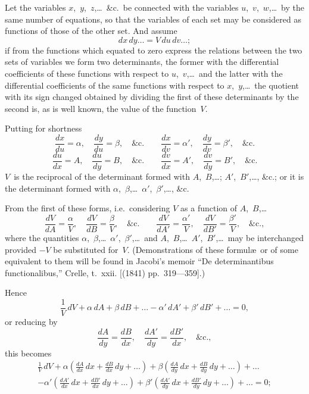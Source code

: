 \documentclass[11pt,a4paper]{book}
\begin{document}
\vspace{10pt}

 Let the variables $x$,~$y$,~$z$,\ldots\ \&c.\ be connected with the variables $u$,~$v$,~$w$,\ldots\ by the same number of equations, so that the variables of each set may be considered as functions of those of the other set. And assume
\[
dx\,dy\ldots = V\,du\,dv\ldots;
\]
if from the functions which equated to zero express the relations between the two sets of variables we form two determinants, the former with the differential coefficients of these functions with respect to $u$,~$v$,\ldots\ and the latter with the differential coefficients of the same functions with respect to $x$,~$y$,\ldots\ the quotient with its sign changed obtained by dividing the first of these determinants by the second is, as is well known, the value of the function~$V$.

Putting for shortness
\[
\frac{dx}{du} = \alpha, \quad \frac{dy}{du} = \beta, \quad \&\text{c.} \qquad
\frac{dx}{dv} = \alpha', \quad \frac{dy}{dv} = \beta', \quad \&\text{c.}
\]
\[
\frac{du}{dx} = A, \quad \frac{du}{dy} = B, \quad \&\text{c.} \qquad
\frac{dv}{dx} = A', \quad \frac{dv}{dy} = B', \quad \&\text{c.}
\]
$V$~is the reciprocal of the determinant formed with $A$,~$B$,\ldots; $A'$,~$B'$,\ldots, \&c.; or it is the determinant formed with $\alpha$,~$\beta$,\ldots\ $\alpha'$,~$\beta'$,\ldots, \&c.

From the first of these forms, i.e.\ considering $V$ as a function of $A$,~$B$,\ldots
\[
\frac{dV}{dA} = \frac{\alpha}{V}, \quad \frac{dV}{dB} = \frac{\beta}{V}, \quad \&\text{c.} \qquad
\frac{dV}{dA'} = \frac{\alpha'}{V}, \quad \frac{dV}{dB'} = \frac{\beta'}{V}, \quad \&\text{c.},
\]
where the quantities $\alpha$,~$\beta$,\ldots\ $\alpha'$,~$\beta'$,\ldots\ and $A$,~$B$,\ldots\ $A'$,~$B'$,\ldots\ may be interchanged provided $-V$ be substituted for~$V$. (Demonstrations of these formul\ae\ or of some equivalent to them will be found in Jacobi's memoir ``De determinantibus functionalibus,'' Crelle, t.~xxii. [(1841) pp.~319---359].)

Hence
\[
\frac{1}{V}\,dV + \alpha\,dA + \beta\,dB + \ldots - \alpha'\,dA' + \beta'\,dB' + \ldots = 0,
\]
or reducing by
\[
\frac{dA}{dy} = \frac{dB}{dx}, \quad \frac{dA'}{dy} = \frac{dB'}{dx}, \quad \&\text{c.},
\]
this becomes
\begin{multline*}
\frac{1}{V}\,dV + \alpha\left(\frac{dA}{dx}\,dx + \frac{dB}{dx}\,dy + \ldots\right) + \beta\left(\frac{dA}{dy}\,dx + \frac{dB}{dy}\,dy + \ldots\right) + \ldots \\
- \alpha'\left(\frac{dA'}{dx}\,dx + \frac{dB'}{dx}\,dy + \ldots\right) + \beta'\left(\frac{dA'}{dy}\,dx + \frac{dB'}{dy}\,dy + \ldots\right) + \ldots = 0;
\end{multline*}
\end{document}
